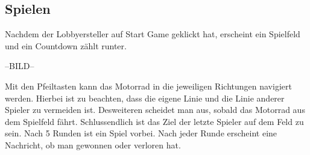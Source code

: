 \documentclass[11pt,ngerman]{article}
\begin{document}
    \subsection{Spielen}
    
    Nachdem der Lobbyersteller auf Start Game geklickt hat, erscheint ein Spielfeld und ein Countdown zählt runter.
    
    --BILD--
    
    Mit den Pfeiltasten kann das Motorrad in die jeweiligen Richtungen navigiert werden. 
    Hierbei ist zu beachten, dass die eigene Linie und die Linie anderer Spieler zu vermeiden ist. Desweiteren scheidet man aus, sobald das Motorrad aus dem Spielfeld fährt. 
    Schlussendlich ist das Ziel der letzte Spieler auf dem Feld zu sein. Nach 5 Runden ist ein Spiel vorbei. Nach jeder Runde erscheint eine Nachricht, ob man gewonnen oder verloren hat.
   
    
\end{document}
